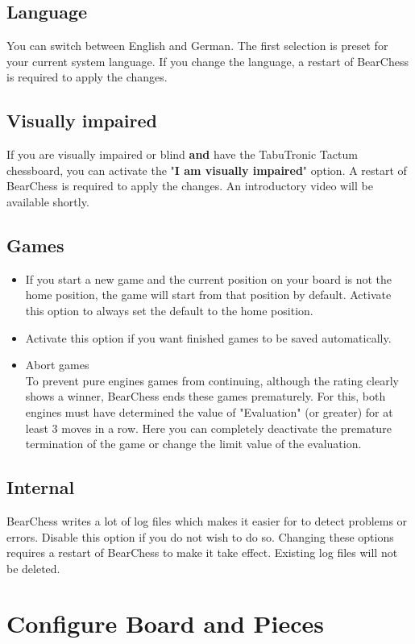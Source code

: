 \documentclass[11pt,a4paper]{article}
\begin{document}
	
	\subsection{Language}
	You can switch between English and German. The first selection is preset for your current system language.
	If you change the language, a restart of BearChess is required to apply the changes.
	
	\subsection{Visually impaired }
	If you are visually impaired or blind \textbf{and} have the TabuTronic Tactum chessboard, you can activate the "\textbf{I am visually impaired}" option. A restart of BearChess is required to apply the changes. An introductory video will be available shortly.
	
	\subsection{Games}
	\begin{itemize}
		\item If you start a new game and the current position on your board is not the home position, the game will start from that position by default. Activate this option to always set the default to the home position.
		\item Activate this option if you want finished games to be saved automatically.
		\item Abort games\\To prevent pure engines games from continuing, although the rating clearly shows a winner, BearChess ends these games prematurely. For this, both engines must have determined the value of "Evaluation" (or greater) for at least 3 moves in a row. Here you can completely deactivate the premature termination of the game or change the limit value of the evaluation.
	\end{itemize}
	
	\subsection{Internal}
	BearChess writes a lot of log files which makes it easier for to detect problems or errors.
	Disable this option if you do not wish to do so. Changing these options requires a restart of BearChess to make it take effect. Existing log files will not be deleted.
	
	
	\section{Configure Board and Pieces} \label{BoardAndPieces}
	
\end{document}
